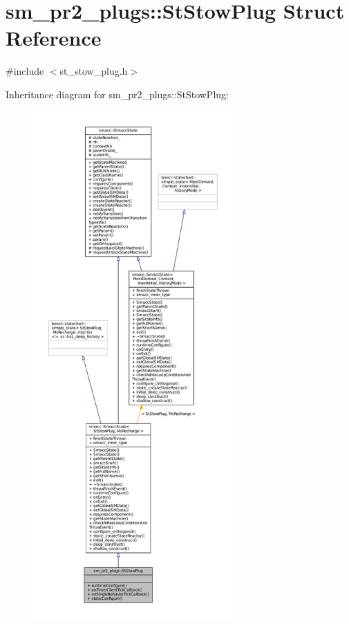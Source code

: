 \hypertarget{structsm__pr2__plugs_1_1StStowPlug}{}\section{sm\+\_\+pr2\+\_\+plugs\+:\+:St\+Stow\+Plug Struct Reference}
\label{structsm__pr2__plugs_1_1StStowPlug}


{\ttfamily \#include $<$st\+\_\+stow\+\_\+plug.\+h$>$}



Inheritance diagram for sm\+\_\+pr2\+\_\+plugs\+:\+:St\+Stow\+Plug\+:
\nopagebreak
\begin{figure}[H]
\begin{center}
\leavevmode
\includegraphics[height=550pt]{structsm__pr2__plugs_1_1StStowPlug__inherit__graph}
\end{center}
\end{figure}



